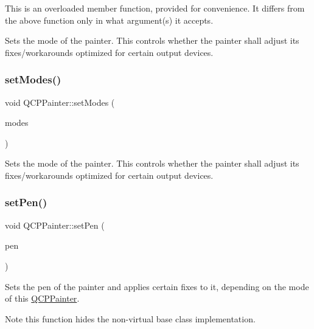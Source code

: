 This is an overloaded member function, provided for convenience. It differs from the above function only in what argument(s) it accepts.

Sets the mode of the painter. This controls whether the painter shall adjust its fixes/workarounds optimized for certain output devices. \mbox{\label{class_q_c_p_painter_a5fac93adc29c7c4dea9f3e171e9e635e}} 
\subsubsection{\texorpdfstring{set\+Modes()}{setModes()}}
{\footnotesize\ttfamily void Q\+C\+P\+Painter\+::set\+Modes (\begin{DoxyParamCaption}\item[{Painter\+Modes}]{modes }\end{DoxyParamCaption})}

Sets the mode of the painter. This controls whether the painter shall adjust its fixes/workarounds optimized for certain output devices. \mbox{\label{class_q_c_p_painter_af9c7a4cd1791403901f8c5b82a150195}} 
\subsubsection{\texorpdfstring{set\+Pen()}{setPen()}\hspace{0.1cm}{\footnotesize\ttfamily [1/3]}}
{\footnotesize\ttfamily void Q\+C\+P\+Painter\+::set\+Pen (\begin{DoxyParamCaption}\item[{const Q\+Pen \&}]{pen }\end{DoxyParamCaption})}

Sets the pen of the painter and applies certain fixes to it, depending on the mode of this \mbox{\hyperlink{class_q_c_p_painter}{Q\+C\+P\+Painter}}.

\begin{DoxyNote}{Note}
this function hides the non-\/virtual base class implementation. 
\end{DoxyNote}
\mbox{\label{class_q_c_p_painter_a5c4d88f21564e156e88ef807f7cf0003}} 
